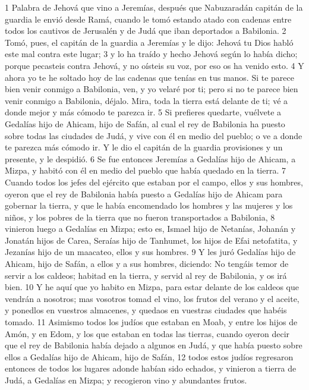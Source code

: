1 Palabra de Jehová que vino a Jeremías, después que Nabuzaradán capitán de la guardia le envió desde Ramá, cuando le tomó estando atado con cadenas entre todos los cautivos de Jerusalén y de Judá que iban deportados a Babilonia.
2 Tomó, pues, el capitán de la guardia a Jeremías y le dijo: Jehová tu Dios habló este mal contra este lugar;
3 y lo ha traído y hecho Jehová según lo había dicho; porque pecasteis contra Jehová, y no oísteis su voz, por eso os ha venido esto.
4 Y ahora yo te he soltado hoy de las cadenas que tenías en tus manos. Si te parece bien venir conmigo a Babilonia, ven, y yo velaré por ti; pero si no te parece bien venir conmigo a Babilonia, déjalo. Mira, toda la tierra está delante de ti; vé a donde mejor y más cómodo te parezca ir.
5 Si prefieres quedarte, vuélvete a Gedalías hijo de Ahicam, hijo de Safán, al cual el rey de Babilonia ha puesto sobre todas las ciudades de Judá, y vive con él en medio del pueblo; o ve a donde te parezca más cómodo ir. Y le dio el capitán de la guardia provisiones y un presente, y le despidió.
6 Se fue entonces Jeremías a Gedalías hijo de Ahicam, a Mizpa, y habitó con él en medio del pueblo que había quedado en la tierra.
7 Cuando todos los jefes del ejército que estaban por el campo, ellos y sus hombres, oyeron que el rey de Babilonia había puesto a Gedalías hijo de Ahicam para gobernar la tierra, y que le había encomendado los hombres y las mujeres y los niños, y los pobres de la tierra que no fueron transportados a Babilonia,
8 vinieron luego a Gedalías en Mizpa; esto es, Ismael hijo de Netanías, Johanán y Jonatán hijos de Carea, Seraías hijo de Tanhumet, los hijos de Efai netofatita, y Jezanías hijo de un maacateo, ellos y sus hombres.
9 Y les juró Gedalías hijo de Ahicam, hijo de Safán, a ellos y a sus hombres, diciendo: No tengáis temor de servir a los caldeos; habitad en la tierra, y servid al rey de Babilonia, y os irá bien. 
10 Y he aquí que yo habito en Mizpa, para estar delante de los caldeos que vendrán a nosotros; mas vosotros tomad el vino, los frutos del verano y el aceite, y ponedlos en vuestros almacenes, y quedaos en vuestras ciudades que habéis tomado.
11 Asimismo todos los judíos que estaban en Moab, y entre los hijos de Amón, y en Edom, y los que estaban en todas las tierras, cuando oyeron decir que el rey de Babilonia había dejado a algunos en Judá, y que había puesto sobre ellos a Gedalías hijo de Ahicam, hijo de Safán,
12 todos estos judíos regresaron entonces de todos los lugares adonde habían sido echados, y vinieron a tierra de Judá, a Gedalías en Mizpa; y recogieron vino y abundantes frutos.

